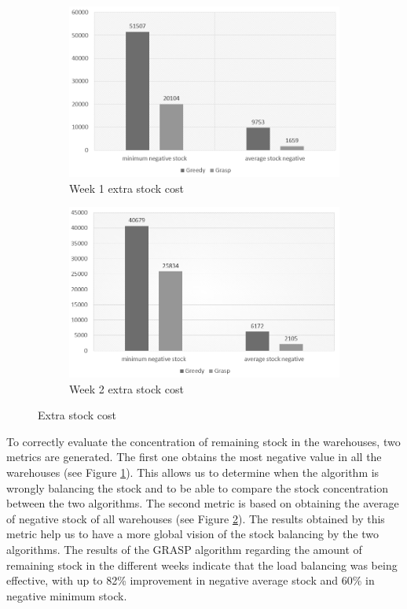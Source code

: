 \documentclass[letterpaper]{article} %
\begin{document}
\begin{figure}[H]
    \begin{subfigure}{.5\textwidth}
      \centering
      \includegraphics[width=\linewidth]{img/week1-stock.png}
      \caption{Week 1 extra stock cost}
      \label{fig:week1}
    \end{subfigure}
    \begin{subfigure}{.5\textwidth}
      \centering
      \includegraphics[width=\linewidth]{img/week2-stock.png}
      \caption{Week 2 extra stock cost}
      \label{fig:week2}
    \end{subfigure}
    \caption{Extra stock cost}
    \label{fig:stock}
\end{figure}


To correctly evaluate the concentration of remaining stock in the warehouses, two metrics are generated. The first one obtains the most negative value in all the warehouses (see Figure \ref{fig:week1}). This allows us to determine when the algorithm is wrongly balancing the stock and to be able to compare the stock concentration between the two algorithms. The second metric is based on obtaining the average of negative stock of all warehouses (see Figure \ref{fig:week2}). The results obtained by this metric help us to have a more global vision of the stock balancing by the two algorithms. The results of the GRASP algorithm regarding the amount of remaining stock in the different weeks indicate that the load balancing was being effective, with up to 82\% improvement in negative average stock and 60\% in negative minimum stock.
\end{document}
